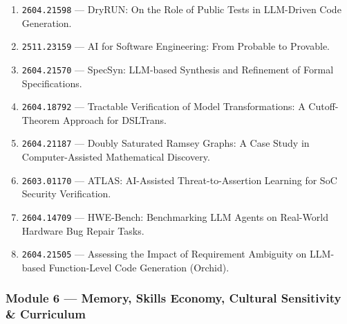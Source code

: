 \documentclass[11pt,letterpaper]{article}
\newcommand{\arxivid}[1]{\texttt{\textcolor{accent}{#1}}}
\begin{document}
\begin{enumerate}[leftmargin=*]
\item \arxivid{2604.21598} --- DryRUN: On the Role of Public Tests in LLM-Driven Code Generation.
\item \arxivid{2511.23159} --- AI for Software Engineering: From Probable to Provable.
\item \arxivid{2604.21570} --- SpecSyn: LLM-based Synthesis and Refinement of Formal Specifications.
\item \arxivid{2604.18792} --- Tractable Verification of Model Transformations: A Cutoff-Theorem Approach for DSLTrans.
\item \arxivid{2604.21187} --- Doubly Saturated Ramsey Graphs: A Case Study in Computer-Assisted Mathematical Discovery.
\item \arxivid{2603.01170} --- ATLAS: AI-Assisted Threat-to-Assertion Learning for SoC Security Verification.
\item \arxivid{2604.14709} --- HWE-Bench: Benchmarking LLM Agents on Real-World Hardware Bug Repair Tasks.
\item \arxivid{2604.21505} --- Assessing the Impact of Requirement Ambiguity on LLM-based Function-Level Code Generation (Orchid).
\end{enumerate}

\subsubsection{Module 6 --- Memory, Skills Economy, Cultural Sensitivity \& Curriculum}
\end{document}
